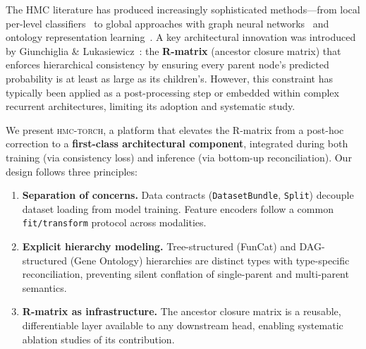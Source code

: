 \documentclass[11pt,a4paper]{article}
\begin{document}
The HMC literature has produced increasingly sophisticated
methods---from local per-level classifiers~\cite{silla2011hmc} to
global approaches with graph neural networks~\cite{zhou2020hiagm} and
ontology representation learning~\cite{www2022ontology}. A key
architectural innovation was introduced by Giunchiglia \&
Lukasiewicz~\cite{giunchiglia2018hmc}: the \textbf{R-matrix}
(ancestor closure matrix) that enforces hierarchical consistency by
ensuring every parent node's predicted probability is at least as
large as its children's. However, this constraint has typically been
applied as a post-processing step or embedded within complex recurrent
architectures, limiting its adoption and systematic study.

We present \textsc{hmc-torch}, a platform that elevates the R-matrix
from a post-hoc correction to a \textbf{first-class architectural
component}, integrated during both training (via consistency loss) and
inference (via bottom-up reconciliation). Our design follows three
principles:

\begin{enumerate}[leftmargin=*,nosep]
  \item \textbf{Separation of concerns.} Data contracts
    (\texttt{DatasetBundle}, \texttt{Split}) decouple dataset loading
    from model training. Feature encoders follow a common
    \texttt{fit/transform} protocol across modalities.
  \item \textbf{Explicit hierarchy modeling.} Tree-structured
    (FunCat) and DAG-structured (Gene Ontology) hierarchies are
    distinct types with type-specific reconciliation, preventing
    silent conflation of single-parent and multi-parent semantics.
  \item \textbf{R-matrix as infrastructure.} The ancestor closure
    matrix is a reusable, differentiable layer available to any
    downstream head, enabling systematic ablation studies of its
    contribution.
\end{enumerate}
\end{document}
